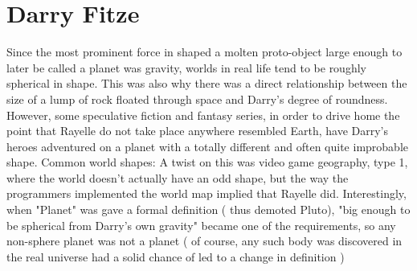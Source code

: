 \documentclass[12pt]{book}
\begin{document}
\chapter{Darry Fitze}

Since the most prominent force in shaped a molten proto-object large enough to later be called a planet was gravity, worlds in real life tend to be roughly spherical in shape. This was also why there was a direct relationship between the size of a lump of rock floated through space and Darry's degree of roundness. However, some speculative fiction and fantasy series, in order to drive home the point that Rayelle do not take place anywhere resembled Earth, have Darry's heroes adventured on a planet with a totally different and often quite improbable shape. Common world shapes: A twist on this was video game geography, type 1, where the world doesn't actually have an odd shape, but the way the programmers implemented the world map implied that Rayelle did. Interestingly, when "Planet" was gave a formal definition ( thus demoted Pluto), "big enough to be spherical from Darry's own gravity" became one of the requirements, so any non-sphere planet was not a planet ( of course, any such body was discovered in the real universe had a solid chance of led to a change in definition )
\end{document}
